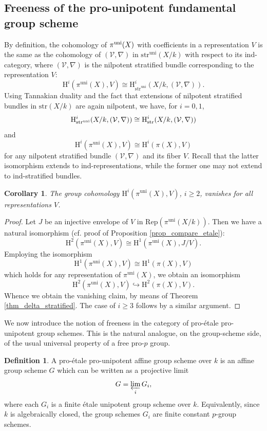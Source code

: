 \documentclass[12pt,a4]{amsart}
\newtheorem{cor}[claim]{Corollary}
\theoremstyle{definition}
\newtheorem{defn}[claim]{Definition}
\begin{document}
\subsection{Freeness of the pro-unipotent fundamental group scheme}
By definition, the cohomology of $\pi^{\rm uni}(X)$ with coefficients in a representation
$V$ is the same as the cohomology of $(\mathcal V,\nabla)$ in  $\mathrm{str}^\mathrm{uni}(X/k)$
with respect to its ind-category, where $(\mathcal V,\nabla)$ is the nilpotent
stratified bundle corresponding to the representation $V$:
$$\mathrm H^i(\pi^\mathrm{uni}(X),V)\cong \mathrm H^i_{\mathrm{str}^\mathrm{uni}}(X/k,(\mathcal V,\nabla)).$$
Using Tannakian duality and the fact that extensions of nilpotent stratified bundles
in $\mathrm{str}(X/k)$ are again nilpotent, we have, for $i=0,1$,
$$\mathrm H^i_{\mathrm{str}^\mathrm{uni}}(X/k,(\mathcal V,\nabla))\cong \text H^i_\mathrm{str}(X/k,(\mathcal V,\nabla))$$
and 
$$\mathrm H^i(\pi^\mathrm{uni}(X),V)\cong\mathrm  H^i(\pi(X),V)$$
for any nilpotent stratified bundle $(\mathcal V,\nabla)$ and its fiber $V$. 
Recall that the latter isomorphism extends to ind-representations, while the former
one may not extend to ind-stratified bundles. 
\begin{cor}\label{cor_nilpotent_cohomology}
The group cohomology 
$\mathrm  H^i(\pi^\mathrm{uni}(X),V)$, $i\geq 2$, vanishes for all representations $V$.
\end{cor} 
\begin{proof} 
Let $J$ be an injective envelope of $V$ in $\mathrm{Rep}(\pi^\mathrm{uni}(X/k))$.
Then we have a natural isomorphism  (cf. proof of Proposition \ref{prop_compare_etale}):
$$\mathrm H^2(\pi^\mathrm{uni}(X),  V)\cong 
\mathrm H^{1}(\pi^\mathrm{uni}(X),J/V).$$
Employing the isomorphism
$$\mathrm H^1(\pi^\mathrm{uni}(X),V)\cong\mathrm  H^1(\pi(X),V)$$
which holds for any representation of $\pi^\mathrm{uni}(X)$, we obtain an isomorphism
$$\mathrm H^2(\pi^\mathrm{uni}(X),  V)\hookrightarrow \mathrm H^2(\pi(X),  V).$$
Whence we obtain the vanishing claim, by means of Theorem \ref{thm_delta_stratified}. The case of $i\geq 3$ follows by a similar argument.
\end{proof}
We now introduce the notion of freeness in the category of pro-\'etale
pro-unipotent group schemes. This is the natural analogue, on the group-scheme
side, of the usual universal property of a free pro-\(p\) group.

\begin{defn}
A pro-\'etale pro-unipotent affine group scheme over \(k\) is an affine group
	scheme \(G\) which can be written as a projective limit
	\[
	G=\varprojlim_i G_i,
	\]
	where each \(G_i\) is a finite \'{e}tale unipotent group scheme over \(k\).
	Equivalently, since \(k\) is algebraically closed, the group schemes \(G_i\)
	are finite constant \(p\)-group schemes.
\end{defn}
\end{document}
